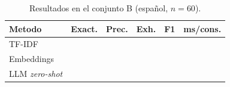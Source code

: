 ﻿%
\begin{table}[t]
\caption{Resultados en el conjunto B (español, $n=60$).}
\label{tab:resB}
\centering\footnotesize
\setlength{\tabcolsep}{3pt}
\begin{tabular}{lccccc}
\toprule
Metodo & Exact. & Prec. & Exh. & F1 & ms/cons. \\
\midrule
TF-IDF & \tbd{--} & \tbd{--} & \tbd{--} & \tbd{--} & \tbd{--} \\
Embeddings & \tbd{--} & \tbd{--} & \tbd{--} & \tbd{--} & \tbd{--} \\
LLM \textit{zero-shot} & \tbd{--} & \tbd{--} & \tbd{--} & \tbd{--} & \tbd{--} \\
\bottomrule
\end{tabular}
\end{table}
